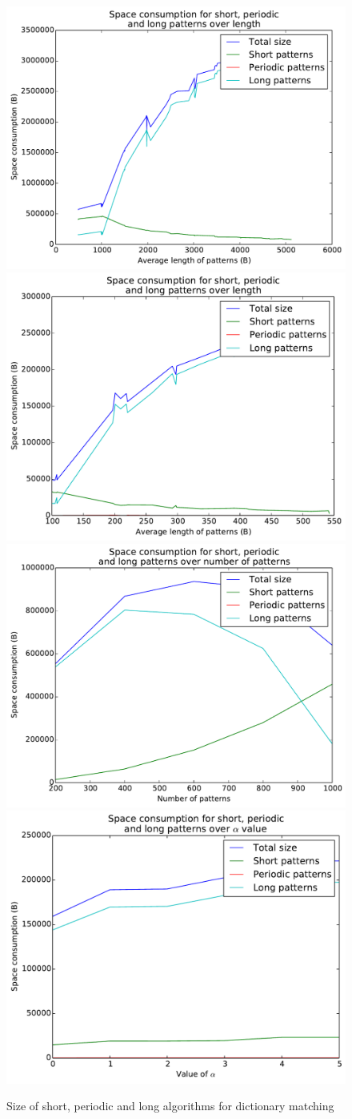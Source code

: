 \documentclass[ %
                    author={Dominic Joseph Moylett},
                    degree={MEng},
                     title={Dictionary Matching with Fingerprints},
                  subtitle={An Empirical Analysis},
                      type={research},
                      year={2015} ]{dissertation}
\begin{document}
\begin{figure}[t]
\begin{center}
  \includegraphics[width=0.5\linewidth]{part_size_length_1000_10000}\includegraphics[width=0.5\linewidth]{part_size_length_200_1000}
  \includegraphics[width=0.5\linewidth]{part_size_num_200_1000}\includegraphics[width=0.5\linewidth]{part_size_alpha}
\end{center}
\caption{Size of short, periodic and long algorithms for dictionary matching}
\label{fig:case-results}
\end{figure}
\end{document}
